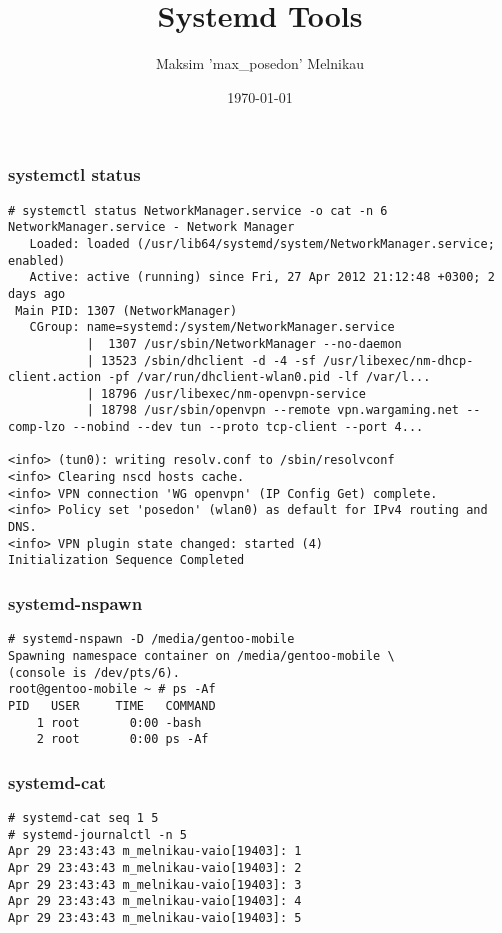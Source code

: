 \documentclass{beamer}
\begin{document}
\title{Systemd Tools}
\author{Maksim 'max\_posedon' Melnikau}
\date{\today}
\frame{\titlepage}

\begin{frame}[fragile]
    \frametitle{systemctl status}
    \begin{verbatim}
# systemctl status NetworkManager.service -o cat -n 6
NetworkManager.service - Network Manager
   Loaded: loaded (/usr/lib64/systemd/system/NetworkManager.service; enabled)
   Active: active (running) since Fri, 27 Apr 2012 21:12:48 +0300; 2 days ago
 Main PID: 1307 (NetworkManager)
   CGroup: name=systemd:/system/NetworkManager.service
           |  1307 /usr/sbin/NetworkManager --no-daemon
           | 13523 /sbin/dhclient -d -4 -sf /usr/libexec/nm-dhcp-client.action -pf /var/run/dhclient-wlan0.pid -lf /var/l...
           | 18796 /usr/libexec/nm-openvpn-service
           | 18798 /usr/sbin/openvpn --remote vpn.wargaming.net --comp-lzo --nobind --dev tun --proto tcp-client --port 4...

<info> (tun0): writing resolv.conf to /sbin/resolvconf
<info> Clearing nscd hosts cache.
<info> VPN connection 'WG openvpn' (IP Config Get) complete.
<info> Policy set 'posedon' (wlan0) as default for IPv4 routing and DNS.
<info> VPN plugin state changed: started (4)
Initialization Sequence Completed
    \end{verbatim}
\end{frame}

\begin{frame}[fragile]
    \frametitle{systemd-nspawn}
    \begin{verbatim}
# systemd-nspawn -D /media/gentoo-mobile 
Spawning namespace container on /media/gentoo-mobile \
(console is /dev/pts/6).
root@gentoo-mobile ~ # ps -Af
PID   USER     TIME   COMMAND
    1 root       0:00 -bash
    2 root       0:00 ps -Af
    \end{verbatim}
\end{frame}

\begin{frame}[fragile]
    \frametitle{systemd-cat}
    \begin{verbatim}
# systemd-cat seq 1 5           
# systemd-journalctl -n 5       
Apr 29 23:43:43 m_melnikau-vaio[19403]: 1
Apr 29 23:43:43 m_melnikau-vaio[19403]: 2
Apr 29 23:43:43 m_melnikau-vaio[19403]: 3
Apr 29 23:43:43 m_melnikau-vaio[19403]: 4
Apr 29 23:43:43 m_melnikau-vaio[19403]: 5
    \end{verbatim}
\end{frame}
\end{document}

